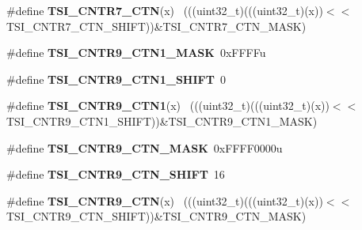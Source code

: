 \begin{DoxyCompactItemize}
\item 
\hypertarget{group___t_s_i___register___masks_gace78c34d2dc546e0a78bc9cc757b1930}{}\#define {\bfseries T\+S\+I\+\_\+\+C\+N\+T\+R7\+\_\+\+C\+T\+N}(x)                                              ~(((uint32\+\_\+t)(((uint32\+\_\+t)(x))$<$$<$T\+S\+I\+\_\+\+C\+N\+T\+R7\+\_\+\+C\+T\+N\+\_\+\+S\+H\+I\+F\+T))\&T\+S\+I\+\_\+\+C\+N\+T\+R7\+\_\+\+C\+T\+N\+\_\+\+M\+A\+S\+K)\label{group___t_s_i___register___masks_gace78c34d2dc546e0a78bc9cc757b1930}

\item 
\hypertarget{group___t_s_i___register___masks_gac90318dbf7dc8a739eae6636a7079613}{}\#define {\bfseries T\+S\+I\+\_\+\+C\+N\+T\+R9\+\_\+\+C\+T\+N1\+\_\+\+M\+A\+S\+K}~0x\+F\+F\+F\+Fu\label{group___t_s_i___register___masks_gac90318dbf7dc8a739eae6636a7079613}

\item 
\hypertarget{group___t_s_i___register___masks_ga22e9b412d3df505c3f1283d700c5a192}{}\#define {\bfseries T\+S\+I\+\_\+\+C\+N\+T\+R9\+\_\+\+C\+T\+N1\+\_\+\+S\+H\+I\+F\+T}~0\label{group___t_s_i___register___masks_ga22e9b412d3df505c3f1283d700c5a192}

\item 
\hypertarget{group___t_s_i___register___masks_ga4f5647846911939a0e7a8eb185a01913}{}\#define {\bfseries T\+S\+I\+\_\+\+C\+N\+T\+R9\+\_\+\+C\+T\+N1}(x)                                            ~(((uint32\+\_\+t)(((uint32\+\_\+t)(x))$<$$<$T\+S\+I\+\_\+\+C\+N\+T\+R9\+\_\+\+C\+T\+N1\+\_\+\+S\+H\+I\+F\+T))\&T\+S\+I\+\_\+\+C\+N\+T\+R9\+\_\+\+C\+T\+N1\+\_\+\+M\+A\+S\+K)\label{group___t_s_i___register___masks_ga4f5647846911939a0e7a8eb185a01913}

\item 
\hypertarget{group___t_s_i___register___masks_ga0df38f853064b362e6ecf50598304b7c}{}\#define {\bfseries T\+S\+I\+\_\+\+C\+N\+T\+R9\+\_\+\+C\+T\+N\+\_\+\+M\+A\+S\+K}~0x\+F\+F\+F\+F0000u\label{group___t_s_i___register___masks_ga0df38f853064b362e6ecf50598304b7c}

\item 
\hypertarget{group___t_s_i___register___masks_ga209e7bab4fc4a6490bd7e64741d0e5c8}{}\#define {\bfseries T\+S\+I\+\_\+\+C\+N\+T\+R9\+\_\+\+C\+T\+N\+\_\+\+S\+H\+I\+F\+T}~16\label{group___t_s_i___register___masks_ga209e7bab4fc4a6490bd7e64741d0e5c8}

\item 
\hypertarget{group___t_s_i___register___masks_ga97a9615523f7d4d083f0327a62603ebd}{}\#define {\bfseries T\+S\+I\+\_\+\+C\+N\+T\+R9\+\_\+\+C\+T\+N}(x)                                              ~(((uint32\+\_\+t)(((uint32\+\_\+t)(x))$<$$<$T\+S\+I\+\_\+\+C\+N\+T\+R9\+\_\+\+C\+T\+N\+\_\+\+S\+H\+I\+F\+T))\&T\+S\+I\+\_\+\+C\+N\+T\+R9\+\_\+\+C\+T\+N\+\_\+\+M\+A\+S\+K)\label{group___t_s_i___register___masks_ga97a9615523f7d4d083f0327a62603ebd}


\end{DoxyCompactItemize}
